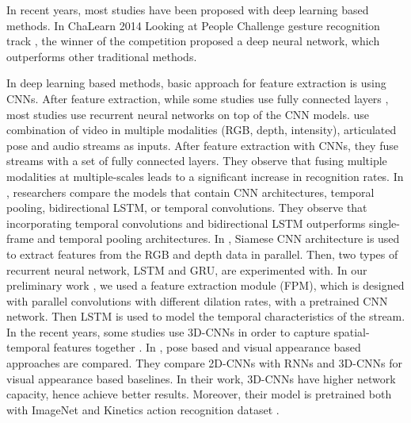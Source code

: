 \documentclass[11pt, a4paper, singlecolumn]{article}
\begin{document}
In recent years, most studies have been proposed with deep learning based methods. In  ChaLearn 2014 Looking at People Challenge gesture recognition track \cite{escalera2014chalearn}, the winner of the competition \cite{neverova2014multi} proposed a deep neural network, which outperforms other traditional methods. 

In deep learning based methods, basic approach for feature extraction is using CNNs. After feature extraction, while some studies use fully connected layers \cite{neverova2015moddrop, unutmaz2019turkish}, most studies use recurrent neural networks \cite{sincan2019isolated, pigou2018beyond, tur2019isolated, bahdanau2014neural} on top of the CNN models. \cite{neverova2015moddrop} use combination of video in multiple modalities (RGB, depth, intensity), articulated pose and audio streams as inputs. After feature extraction with CNNs, they fuse streams with a set of fully connected layers. They observe that fusing multiple modalities at multiple-scales leads to a significant increase in recognition rates. In \cite{pigou2018beyond}, researchers compare the models that contain CNN architectures, temporal pooling, bidirectional LSTM, or temporal convolutions. They observe that incorporating temporal convolutions and bidirectional LSTM outperforms single-frame and temporal pooling architectures. In \cite{tur2019isolated}, Siamese CNN architecture is used to extract features from the RGB and depth data in parallel. Then, two types of recurrent neural network, LSTM and GRU, are experimented with. In our preliminary work \cite{sincan2019isolated}, we used a feature extraction module (FPM), which is designed with parallel convolutions with different dilation rates, with a pretrained CNN network. Then LSTM is used to model the temporal characteristics of the stream. In the recent years, some studies use 3D-CNNs in order to capture spatial-temporal features together \cite{huang2018attention, li2020word, joze2018ms}. In \cite{li2020word}, pose based and visual appearance based approaches are compared. They compare 2D-CNNs with RNNs and 3D-CNNs for visual appearance based baselines. In their work, 3D-CNNs have higher network capacity, hence achieve better results. Moreover, their model is pretrained both with ImageNet \cite{russakovsky2015imagenet} and Kinetics action recognition dataset \cite{carreira2017quo}. 
\end{document}
